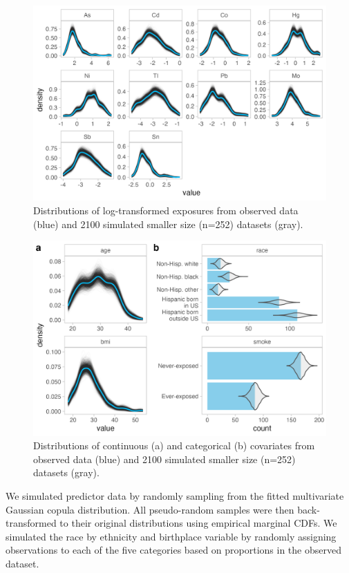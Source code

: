 \documentclass[12pt, twoside]{amherstthesis}
\begin{document}
\begin{figure}

{\centering \includegraphics[width=0.75\linewidth]{figures/ch4_univ_exp_sim} 

}

\caption{Distributions of log-transformed exposures from observed data (blue) and 2100 simulated smaller size (n=252) datasets (gray).}\label{fig:univexpsim}
\end{figure}
\begin{figure}

{\centering \includegraphics[width=0.75\linewidth]{figures/ch4_univ_cov_sim} 

}

\caption{Distributions of continuous (a) and categorical (b) covariates from observed data (blue) and 2100 simulated smaller size (n=252) datasets (gray).}\label{fig:univcovsim}
\end{figure}
We simulated predictor data by randomly sampling from the fitted multivariate Gaussian copula distribution. All pseudo-random samples were then back-transformed to their original distributions using empirical marginal CDFs. We simulated the race by ethnicity and birthplace variable by randomly assigning observations to each of the five categories based on proportions in the observed dataset.
\end{document}
